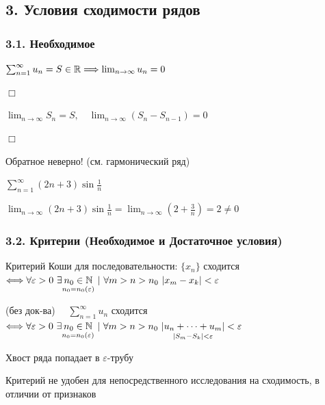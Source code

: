 \documentclass[12pt]{article}
\begin{document}
    \mediumvspace

    \subsection{3. Условия сходимости рядов}

    \subsubsection{3.1. Необходимое}

    \begin{MyTheorem}
        \Ths $\sum_{n = 1}^\infty u_n = S \in \mathbb{R} \Longrightarrow \lim_{n \to \infty} u_n = 0$
    \end{MyTheorem}

    \begin{tcolorbox}
        $\Box$

        $\lim_{n \to \infty} S_n = S, \quad \lim_{n\to\infty} (S_n - S_{n - 1}) = 0$

        $\Box$
    \end{tcolorbox}

    \Nota Обратное неверно! (см. гармонический ряд)

    \Ex $\sum_{n = 1}^\infty (2n + 3) \sin \frac{1}{n}$

    $\lim_{n \to \infty} (2n + 3) \sin \frac{1}{n} = \lim_{n \to \infty} (2 + \frac{3}{n}) = 2 \neq 0$

    \subsubsection{3.2. Критерии (Необходимое и Достаточное условия)}

    \Mem Критерий Коши для последовательности: $\{x_n\}$ сходится $\Longleftrightarrow \forall \varepsilon > 0 \ \exists \underset{n_0 = n_0 (\varepsilon)}{n_0 \in \mathbb{N}} \ | \ \forall m > n > n_0 \ |x_m - x_k| < \varepsilon$

    \begin{MyTheorem}
        \Ths (без док-ва) $\quad \sum_{n = 1}^\infty u_n$ сходится $\Longleftrightarrow \forall \varepsilon > 0 \ \exists \underset{n_0 = n_0 (\varepsilon)}{n_0 \in \mathbb{N}} \ | \ \forall m > n > n_0 \ \underset{|S_m - S_k| < \varepsilon}{|u_n + \dots + u_m|} < \varepsilon$
    \end{MyTheorem}

    \Nota Хвост ряда попадает в $\varepsilon$-трубу

    \Notas Критерий не удобен для непосредственного исследования на сходимость, в отличии от признаков
\end{document}
